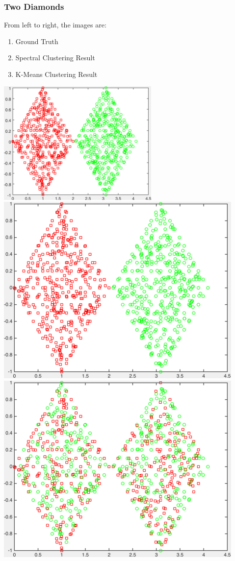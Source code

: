 \documentclass[11pt]{article}
\begin{document}
\subsubsection*{Two Diamonds} 
From left to right, the images are:
\begin{enumerate}
\item Ground Truth
\item Spectral Clustering Result
\item K-Means Clustering Result
\end{enumerate}
\begin{center}
\includegraphics[scale=0.5]{twoDiamonds} \ 
\includegraphics[scale=0.25]{results_spectral_two_diamonds} \ 
\includegraphics[scale=0.25]{results_kmeans_two_diamonds}
\end{center}
\end{document}
